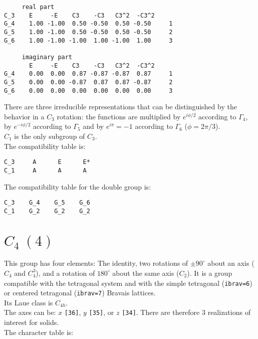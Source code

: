 \documentclass[12pt,a4paper,twoside]{report}
\begin{document}
\begin{tcolorbox}
\begin{footnotesize}
\begin{verbatim}
     real part
C_3    E     -E    C3    -C3   C3^2  -C3^2
G_4    1.00 -1.00  0.50 -0.50  0.50 -0.50     1
G_5    1.00 -1.00  0.50 -0.50  0.50 -0.50     2
G_6    1.00 -1.00 -1.00  1.00 -1.00  1.00     3

     imaginary part
       E     -E    C3    -C3   C3^2  -C3^2
G_4    0.00  0.00  0.87 -0.87 -0.87  0.87     1
G_5    0.00  0.00 -0.87  0.87  0.87 -0.87     2
G_6    0.00  0.00  0.00  0.00  0.00  0.00     3
\end{verbatim}
\end{footnotesize}
\end{tcolorbox}

There are three irreducible representations that can be distinguished by the
behavior in a $C_3$ rotation: the functions are multiplied by $e^{i\phi/2}$ according
to $\Gamma_4$, by $e^{-i\phi/2}$ according to $\Gamma_5$ and by $e^{i\pi}=-1$ 
according to $\Gamma_6$ ($\phi=2 \pi / 3$). \\
$C_1$ is the only subgroup of $C_3$. \\
The compatibility table is:

\begin{tcolorbox}
\begin{footnotesize}
\begin{verbatim}
C_3     A      E      E*  
C_1     A      A      A
\end{verbatim}
\end{footnotesize}
\end{tcolorbox}

The compatibility table for the double group is:

\begin{tcolorbox}
\begin{footnotesize}
\begin{verbatim}
C_3    G_4    G_5    G_6 
C_1    G_2    G_2    G_2
\end{verbatim}
\end{footnotesize}
\end{tcolorbox}

\newpage
{\color{coral}\section{$C_4\ (4)$}}
\color{black}
This group has four elements: The identity, two rotations of $\pm90^\circ$ 
about an axis ($C_4$ and $C_4^3$), and a rotation of $180^\circ$ about the same
axis ($C_2$).
It is a group compatible with the tetragonal system and with the
simple tetragonal (\texttt{ibrav=6}) or centered tetragonal (\texttt{ibrav=7})
Bravais lattices. \\ 
Its Laue class is $C_{4h}$. \\
The axes can be: $x$ \texttt{[36]}, $y$ \texttt{[35]}, or $z$ \texttt{[34]}.
There are therefore $3$ realizations of interest for solids. \\
The character table is:
\end{document}
